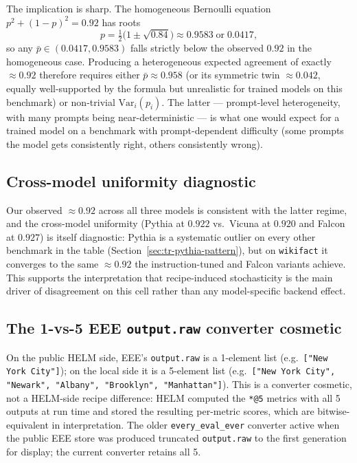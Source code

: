 \documentclass[11pt]{article}
\begin{document}
The implication is sharp.
The homogeneous Bernoulli equation $p^2 + (1-p)^2 = 0.92$ has roots
\[
  p = \tfrac{1}{2}\bigl(1 \pm \sqrt{0.84}\bigr)
    \approx 0.9583 \;\text{or}\; 0.0417,
\]
so any $\bar p \in (0.0417, 0.9583)$ falls strictly below the
  observed $0.92$ in the homogeneous case.
Producing a heterogeneous expected agreement of exactly $\approx 0.92$
  therefore requires either $\bar p \approx 0.958$ (or its symmetric
  twin $\approx 0.042$, equally well-supported by the formula but
  unrealistic for trained models on this benchmark) or non-trivial
  $\mathrm{Var}_i(p_i)$.
The latter --- prompt-level heterogeneity, with many prompts being
  near-deterministic --- is what one would expect for a trained model
  on a benchmark with prompt-dependent difficulty
  (some prompts the model gets consistently right, others
  consistently wrong).

\subsection{Cross-model uniformity diagnostic}
\label{sec:tr-case-c-uniformity}

Our observed $\approx 0.92$ across all three models is consistent
  with the latter regime, and the cross-model uniformity
  (Pythia at $0.922$ vs.\ Vicuna at $0.920$ and Falcon at $0.927$)
  is itself diagnostic: Pythia is a systematic outlier on every other
  benchmark in the table (Section~\ref{sec:tr-pythia-pattern}), but
  on \texttt{wikifact} it converges to the same $\approx 0.92$ the
  instruction-tuned and Falcon variants achieve.
This supports the interpretation that recipe-induced stochasticity
  is the main driver of disagreement on this cell rather than any
  model-specific backend effect.

\subsection{\texorpdfstring{The 1-vs-5 EEE \texttt{output.raw} converter cosmetic}{The 1-vs-5 EEE output.raw converter cosmetic}}
\label{sec:tr-case-c-cosmetic}

On the public HELM side, EEE's \texttt{output.raw} is a 1-element
  list (e.g.\ \texttt{["New York City"]});
on the local side it is a 5-element list
  (e.g.\ \texttt{["New York City", "Newark", "Albany", "Brooklyn",
  "Manhattan"]}).
This is a converter cosmetic, not a HELM-side recipe difference:
  HELM computed the \texttt{*@5} metrics with all 5 outputs at run
  time and stored the resulting per-metric scores, which are
  bitwise-equivalent in interpretation.
The older \texttt{every\_eval\_ever} converter active when the
  public EEE store was produced truncated \texttt{output.raw} to the
  first generation for display; the current converter retains all 5.
\end{document}
